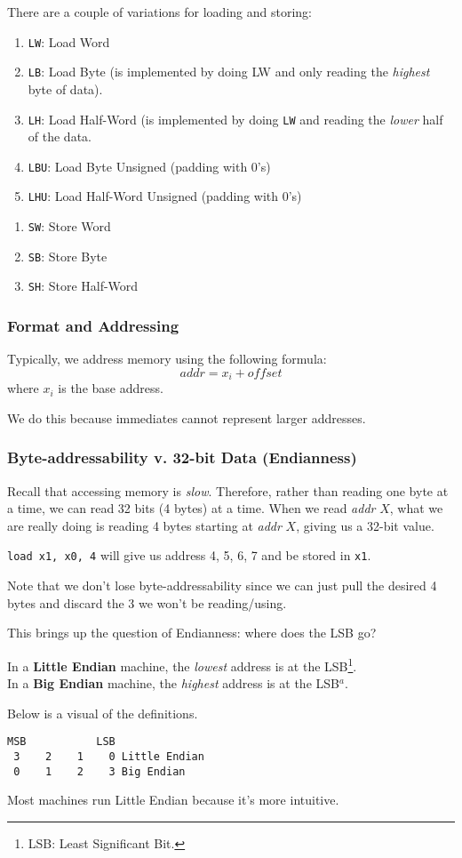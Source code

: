 \documentclass{report}
\newcommand{\definition}[2]{\begin{tcolorbox}[title={Definition: #1}]{#2}\end{tcolorbox}}
\newcommand{\example}[2]{\begin{tcolorbox}[colback=blue!5!white,colframe=black!75!blue,title={Example:
      #1}]{#2}\end{tcolorbox}}
\begin{document}
There are a couple of variations for loading and storing:
\begin{enumerate}[label=\textit{(\roman*)}]
\item \texttt{LW}: Load Word
\item \texttt{LB}: Load Byte (is implemented by doing LW and only reading the \textit{highest} byte
  of data).
\item \texttt{LH}: Load Half-Word (is implemented by doing \texttt{LW} and reading the
  \textit{lower} half of the data.
\item \texttt{LBU}: Load Byte Unsigned (padding with 0's)
\item \texttt{LHU}: Load Half-Word Unsigned (padding with 0's)
\end{enumerate}
\begin{enumerate}[label=\textit{(\roman*)}]
\item \texttt{SW}: Store Word
\item \texttt{SB}: Store Byte
\item \texttt{SH}: Store Half-Word
\end{enumerate}


\subsubsection{Format and Addressing}
\definition{Base + Offset}{
  Typically, we address memory using the following formula:
  \[\textit{addr} = x_i + \textit{offset}\] where $x_i$ is the base address.
}
We do this because immediates cannot represent larger addresses.


\subsubsection{Byte-addressability v. 32-bit Data (Endianness)}
Recall that accessing memory is \textit{slow}. Therefore, rather than reading one byte at a time, we
can read 32 bits (4 bytes) at a time.  When we read \textit{addr} $X$, what we are really doing is
reading 4 bytes starting at \textit{addr} $X$, giving us a 32-bit value.

\example{Load}{
\texttt{load x1, x0, 4} will give us address 4, 5, 6, 7 and be stored in \texttt{x1}.
}
Note that we don't lose byte-addressability since we can just pull the desired 4 bytes and discard
the 3 we won't be reading/using.

This brings up the question of Endianness: where does the LSB go?

\definition{Little and Big Endian}{
  In a \textbf{Little Endian} machine, the \textit{lowest} address is at the LSB\footnote{LSB: Least
    Significant Bit.}. \\
  In a \textbf{Big Endian} machine, the \textit{highest} address is at the LSB$^a$.
}
Below is a visual of the definitions.
\begin{verbatim}
MSB           LSB
 3    2    1    0 Little Endian
 0    1    2    3 Big Endian
\end{verbatim}
Most machines run Little Endian because it's more intuitive.
\end{document}
